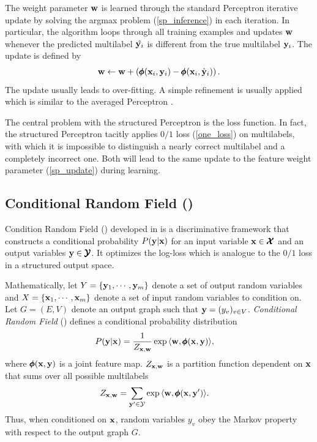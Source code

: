 {The weight parameter $\mathbf {w}$ is learned through the standard Perceptron iterative update by solving the argmax problem (\ref{sp_inference}) in each iteration.
In particular, the algorithm loops through all training examples and updates $\mathbf {w}$ whenever the predicted multilabel $\hat{\mathbf {y}_i}$ is different from the true multilabel $\mathbf {y}_i$.
The update is defined by
\begin{align}
	\mathbf {w} \leftarrow \mathbf {w} + \left(\pmb \phi(\mathbf {x}_i,\mathbf {y}_i) - \pmb \phi(\mathbf {x}_i,\hat{\mathbf {y}}_i)\right). \label{sp_update}
\end{align}
The update usually leads to over-fitting.
A simple refinement is usually applied which is similar to the averaged Perceptron \citep{Freund99large}.

The central problem with the structured Perceptron is the loss function.
In fact, the structured Perceptron tacitly applies $0/1$ loss (\ref{one_loss}) on multilabels, with which it is impossible to distinguish a nearly correct multilabel and a completely incorrect one.
Both will lead to the same update to the feature weight parameter (\ref{sp_update}) during learning.


%
% 
\subsection{Conditional Random Field (\crf)} \label{sc_crf}

Condition Random Field (\crf) developed in \citep{lafferty01,taskar02} is a discriminative framework that constructs a conditional probability $P(\mathbf {y}|\mathbf {x})$ for an input variable $\mathbf {x}\in\pmb {\mathcal{X}}$ and an output variables $\mathbf {y}\in\pmb {\mathcal{Y}}$.
It optimizes the log-loss which is analogue to the $0/1$ loss in a structured output space.

Mathematically, let $Y=\{\mathbf {y}_1,\cdots,\mathbf {y}_m\}$ denote a set of output random variables and $X=\{\mathbf {x}_1,\cdots,\mathbf {x}_m\}$ denote a set of input random variables to condition on.
Let $G=(E,V)$ denote an output graph such that $\mathbf {y} = (y_v)_{v\in V}$.
\textit{Conditional Random Field} (\crf) defines a conditional probability distribution
\begin{align*}
	P(\mathbf {y}|\mathbf {x}) &= \frac{1}{Z_{\mathbf {x},\mathbf {w}}}\exp{\langle \mathbf {w}, \pmb \phi(\mathbf {x},\mathbf {y}) \rangle},
\end{align*}
where $\pmb \phi(\mathbf {x},\mathbf {y})$ is a joint feature map. 
$Z_{\mathbf {x},\mathbf {w}}$ is a partition function dependent on $\mathbf {x}$ that sums over all possible multilabels 
\begin{align}
	Z_{\mathbf {x},\mathbf {w}} &= \sum_{\mathbf {y}'\in\mathcal{Y}}\exp{\langle \mathbf {w}, \pmb \phi(\mathbf {x},\mathbf {y}') \rangle}. \label{crf_partition_function}
\end{align}
Thus, when conditioned on $\mathbf {x}$, random variables $y_v$ obey the Markov property with respect to the output graph $G$.

}
